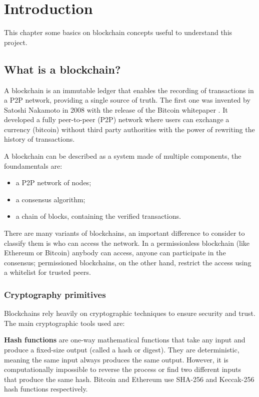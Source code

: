 \chapter{Introduction}
\label{chap:introduction}
This chapter some basics on blockchain concepts useful to understand this project. 

\section{What is a blockchain?}
A blockchain is an immutable ledger that enables the recording of transactions in a P2P network, providing a single source 
of truth. The first one was invented by Satoshi Nakamoto in 2008 with the release of the Bitcoin whitepaper 
\cite{nakamoto2008bitcoin}. It developed a fully peer-to-peer (P2P) network where users can exchange a 
currency (bitcoin) without third party authorities with the power of rewriting the history of transactions. 

A blockchain can be described as a system made of multiple components, the foundamentals are: 
\begin{itemize}
  \item a P2P network of nodes; 
  \item a consensus algorithm;
  \item a chain of blocks, containing the verified transactions.
\end{itemize}

There are many variants of blockchains, an important difference to consider to classify them is who can access the network. 
In a \b{permissionless} blockchain (like Ethereum or Bitcoin) anybody can access, anyone can participate in the consensus; \b{permissioned} blockchains,
on the other hand, restrict the access using a whitelist for trusted peers. 

\subsection{Cryptography primitives}
Blockchains rely heavily on cryptographic techniques to ensure security and trust. The main cryptographic tools used are:

\textbf{Hash functions} are one-way mathematical functions that take any input and produce a fixed-size output (called a hash or digest). They are deterministic, meaning the same input always produces the same output. However, it is computationally impossible to reverse the process or find two different inputs that produce the same hash. Bitcoin and Ethereum use SHA-256 and Keccak-256 hash functions respectively.

